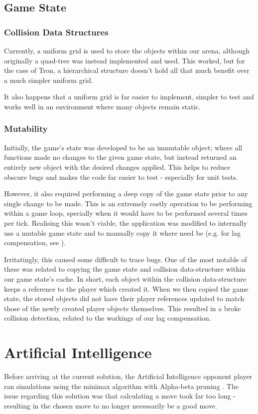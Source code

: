 \documentclass{standalone}
\begin{document}
		\subsection{Game State}
			\subsubsection{Collision Data Structures}
				Currently, a uniform grid is used to store the objects within our arena, although originally a quad-tree was instead implemented and used. This worked, but for the case of Tron, a hierarchical structure doesn't hold all that much benefit over a much simpler uniform grid.

				It also happens that a uniform grid is far easier to implement, simpler to test and works well in an environment where many objects remain static.

			\subsubsection{Mutability}
				Initially, the game's state was developed to be an immutable object; where all functions made no changes to the given game state, but instead returned an entirely new object with the desired changes applied. This helps to reduce obscure bugs and makes the code far easier to test - especially for unit tests.

				However, it also required performing a deep copy of the game state prior to any single change to be made. This is an extremely costly operation to be performing within a game loop, specially when it would have to be performed several times per tick. Realising this wasn't viable, the application was modified to internally use a mutable game state and to manually copy it where need be (e.g. for lag compensation, see ).

				Irritatingly, this caused some difficult to trace bugs. One of the most notable of these was related to copying the game state and collision data-structure within our game state's cache. In short, each object within the collision data-structure keeps a reference to the player which created it. When we then copied the game state, the stored objects did not have their player references updated to match those of the newly created player objects themselves. This resulted in a broke collision detection, related to the workings of our lag compensation.

	\section{Artificial Intelligence}
		Before arriving at the current solution, the Artificial Intelligence opponent player ran simulations using the minimax algorithm \parencite{minimax} with Alpha-beta pruning \parencite{alphaBeta}. The issue regarding this solution was that calculating a move took far too long - resulting in the chosen move to no longer necessarily be a good move.
\end{document}
